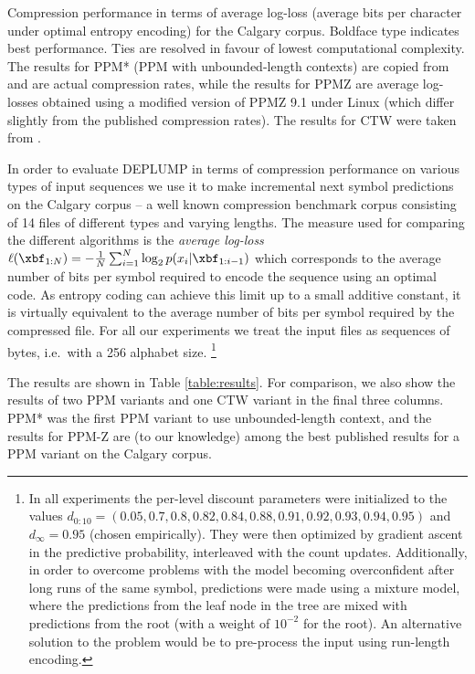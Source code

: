 {\begin{table*}[t]
\begin{center}
\end{center}
\caption{Compression performance in terms of average log-loss (average bits
per character under optimal entropy encoding) for the Calgary corpus.
Boldface type indicates best performance.  Ties are resolved in favour of
lowest computational complexity.  
The results for PPM* (PPM with unbounded-length contexts) are copied from 
\citep{cleary95unboundedlength} and are actual compression rates, while the
results for PPMZ are average log-losses obtained using a modified version of 
PPMZ 9.1 under Linux \citep{ppmzforlinux} (which differ slightly from the
published compression rates). The results for CTW were taken from
\citep{ctwresults}.}
\label{table:results}
\end{table*}
}


In order to evaluate DEPLUMP in terms of compression performance on various types of
input sequences we use it to make incremental next symbol predictions on the
Calgary corpus -- a well known compression benchmark corpus consisting of 14 files of
different types and varying lengths. The measure used for comparing the
different algorithms is the \emph{average log-loss} 
$\ell(\xbf_{1:N}) = -\frac{1}{N}\sum_{i=1}^N \log_2 p(x_i|\xbf_{1:i-1})$
which corresponds to the average number of bits per symbol required to encode
the sequence using an optimal code. As entropy coding can achieve this limit
up to a small additive constant, it is virtually equivalent to the average
number of bits per symbol required by the compressed file. For all our experiments we treat the input files as sequences of bytes, i.e.\ with a 256 alphabet size.%
\footnote{
In all experiments the per-level discount parameters were initialized to the
values \mbox{$d_{0:10} = (0.05,
0.7, 0.8, 0.82, 0.84, 0.88, 0.91, 0.92, 0.93, 0.94, 0.95)$} and
$d_{\infty}=0.95$ (chosen empirically). 
They were then optimized by gradient ascent in the predictive probability,
interleaved with the count updates. Additionally, in order to overcome
problems with the model becoming overconfident after long runs of the same
symbol, predictions were made using a mixture model, where the predictions from
the leaf node in the tree are mixed with predictions from the root (with a
weight of $10^{-2}$ for the root). An alternative solution to the problem
would be to pre-process the input using run-length encoding.  
}

The results are shown in Table \ref{table:results}. 
For comparison, we also
show the results of two PPM variants and one CTW variant in the final three columns. 
PPM* was the first PPM variant to use unbounded-length context, 
and the results for PPM-Z are (to our knowledge) among
the best published results for a PPM variant on the Calgary corpus. 

